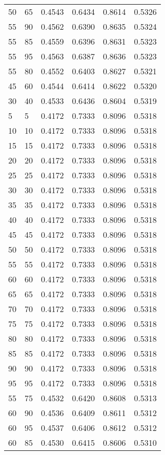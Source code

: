 \begin{center}
\begin{longtable}{|l|l|l|l|l|l|}
50 & 65 & 0.4543 & 0.6434 & 0.8614 & 0.5326 \\
55 & 90 & 0.4562 & 0.6390 & 0.8635 & 0.5324 \\
55 & 85 & 0.4559 & 0.6396 & 0.8631 & 0.5323 \\
55 & 95 & 0.4563 & 0.6387 & 0.8636 & 0.5323 \\
55 & 80 & 0.4552 & 0.6403 & 0.8627 & 0.5321 \\
45 & 60 & 0.4544 & 0.6414 & 0.8622 & 0.5320 \\
30 & 40 & 0.4533 & 0.6436 & 0.8604 & 0.5319 \\
5  & 5  & 0.4172 & 0.7333 & 0.8096 & 0.5318 \\
10 & 10 & 0.4172 & 0.7333 & 0.8096 & 0.5318 \\
15 & 15 & 0.4172 & 0.7333 & 0.8096 & 0.5318 \\
20 & 20 & 0.4172 & 0.7333 & 0.8096 & 0.5318 \\
25 & 25 & 0.4172 & 0.7333 & 0.8096 & 0.5318 \\
30 & 30 & 0.4172 & 0.7333 & 0.8096 & 0.5318 \\
35 & 35 & 0.4172 & 0.7333 & 0.8096 & 0.5318 \\
40 & 40 & 0.4172 & 0.7333 & 0.8096 & 0.5318 \\
45 & 45 & 0.4172 & 0.7333 & 0.8096 & 0.5318 \\
50 & 50 & 0.4172 & 0.7333 & 0.8096 & 0.5318 \\
55 & 55 & 0.4172 & 0.7333 & 0.8096 & 0.5318 \\
60 & 60 & 0.4172 & 0.7333 & 0.8096 & 0.5318 \\
65 & 65 & 0.4172 & 0.7333 & 0.8096 & 0.5318 \\
70 & 70 & 0.4172 & 0.7333 & 0.8096 & 0.5318 \\
75 & 75 & 0.4172 & 0.7333 & 0.8096 & 0.5318 \\
80 & 80 & 0.4172 & 0.7333 & 0.8096 & 0.5318 \\
85 & 85 & 0.4172 & 0.7333 & 0.8096 & 0.5318 \\
90 & 90 & 0.4172 & 0.7333 & 0.8096 & 0.5318 \\
95 & 95 & 0.4172 & 0.7333 & 0.8096 & 0.5318 \\
55 & 75 & 0.4532 & 0.6420 & 0.8608 & 0.5313 \\
60 & 90 & 0.4536 & 0.6409 & 0.8611 & 0.5312 \\
60 & 95 & 0.4537 & 0.6406 & 0.8612 & 0.5312 \\
60 & 85 & 0.4530 & 0.6415 & 0.8606 & 0.5310 \\

\end{longtable}
\end{center}
